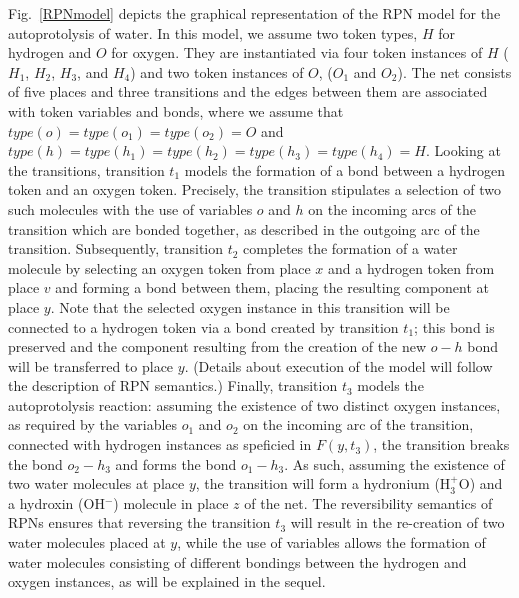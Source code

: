 \documentclass[runningheads]{llncs}
\newcommand{\type}{\mathit{type}}
\begin{document}
Fig.~\ref{RPNmodel} depicts the graphical representation of the RPN model for the autoprotolysis of water.
In this model, we assume two token types, $H$ for hydrogen
and $O$ for oxygen. They are instantiated via four token instances of $H$ ($H_1$, $H_2$, $H_3$, and $H_4$) and two token instances of
$O$, ($O_1$ and $O_2$). The net consists of five places and three transitions and the edges between
them are associated with token variables and bonds, where we assume that $\type(o)=\type(o_1)=\type(o_2) = O$
and $\type(h)=\type(h_1)=\type(h_2)=\type(h_3)=\type(h_4)=H$. 
Looking at the transitions, transition $t_1$ models the formation of a bond between a hydrogen
token and an oxygen token. Precisely, the transition stipulates a selection of two such
molecules with the use
of variables $o$ and $h$ on the incoming arcs of the transition which are bonded
together, as described in the outgoing arc of the transition.
Subsequently, transition $t_2$ completes
the formation of a water molecule by selecting an oxygen token from place $x$ and
a hydrogen token from place $v$ and forming a bond between them, placing the resulting component at place $y$. Note that the selected oxygen instance in this transition will be connected to a hydrogen token via a bond 
created by transition $t_1$; this bond is preserved and the component resulting from the creation of
the new $o-h$ bond will be transferred to place $y$. (Details about execution of the model will follow the
description of RPN semantics.)
Finally, transition $t_3$ models the autoprotolysis reaction: assuming the existence of two distinct oxygen
instances, as required by the variables $o_1$ and $o_2$ on the incoming arc of the transition, connected
with hydrogen instances as speficied in $F(y,t_3)$, the transition breaks the bond $o_2-h_3$ and forms the
bond  $o_1-h_3$.  As such, assuming the existence of two water molecules at place $y$, the transition
will form  a hydronium  (H$_3^+$O) and a hydroxin (OH$^-$) molecule in place $z$ of the net.
The reversibility semantics of RPNs ensures that  reversing the transition $t_3$ will result in the re-creation
of  two water molecules placed at $y$, while the use of variables allows the formation of water molecules consisting
of different bondings between the hydrogen and oxygen instances, as will be explained in the sequel.
\end{document}
